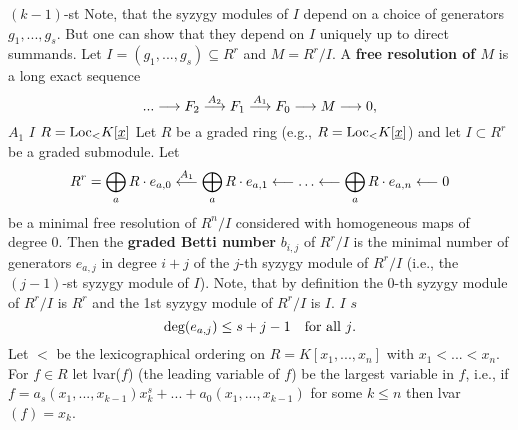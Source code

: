 $(k-1)$-st 
Note, that the syzygy modules of $I$ depend on a choice of generators $g_1, ..., g_s$.
But one can show that they depend on $I$ uniquely up to direct summands.
Let $I=(g_1,...,g_s)\subseteq R^r$ and $M= R^r/I$.
A {\bf free resolution of $M$} is a long exact sequence
$$...\longrightarrow F_2 \buildrel{A_2}\over{\longrightarrow} F_1
\buildrel{A_1}\over{\longrightarrow} F_0\longrightarrow M\longrightarrow
0,$$
$A_1$
$I$
$R=\hbox{Loc}_< K[\underline{x}]$
Let $R$ be a graded ring (e.g., $R = \hbox{Loc}_< K[\underline{x}]$) and
let $I \subset R^r$ be a graded submodule. Let
$$
  R^r = \bigoplus_a R\cdot e_{a,0} \buildrel A_1 \over \longleftarrow
        \bigoplus_a R\cdot e_{a,1} \longleftarrow \ldots \longleftarrow
        \bigoplus_a R\cdot e_{a,n} \longleftarrow 0
$$
be a minimal free resolution of $R^n/I$ considered with homogeneous maps
of degree 0. Then the {\bf graded Betti number} $b_{i,j}$ of $R^r/I$ is
the minimal number of generators $e_{a,j}$ in degree $i+j$ of the $j$-th
syzygy module of $R^r/I$ (i.e., the $(j-1)$-st syzygy module of
$I$). Note, that by definition the $0$-th syzygy module of $R^r/I$ is $R^r$
and the 1st syzygy module of $R^r/I$ is $I$.
$I$
$s$
$$
    \hbox{deg}(e_{a,j}) \le s+j-1 \quad \hbox{for all $j$.}
$$
Let $<$ be the lexicographical ordering on $R=K[x_1,...,x_n]$ with $x_1
< ... < x_n$.
For $f \in R$ let lvar($f$) (the leading variable of $f$) be the largest
variable in $f$,
i.e., if $f=a_s(x_1,...,x_{k-1})x_k^s+...+a_0(x_1,...,x_{k-1})$ for some
$k \leq n$ then lvar$(f)=x_k$.


